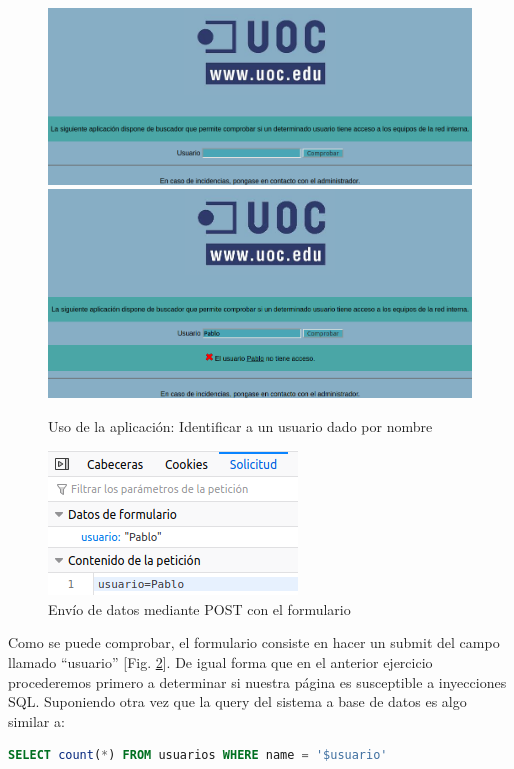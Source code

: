 \documentclass[a4paper,oneside]{article}
\begin{document}
\begin{figure}[h!]
  \centering
  \includegraphics[scale=0.4]{images/blindsql.png}\\
  \vspace{.5cm}
  \includegraphics[scale=0.4]{images/blindsql1.png}
  \caption{Uso de la aplicación: Identificar a un usuario dado por nombre}
  \label{fig:blindsql}
\end{figure}

\begin{figure}[h!]
  \centering
  \includegraphics{images/form_request.png}
  \caption{Envío de datos mediante POST con el formulario}
  \label{fig:form_request}
\end{figure}

Como se puede comprobar, el formulario consiste en hacer un submit del campo llamado ``usuario'' [Fig. \ref{fig:form_request}].
De igual forma que en el anterior ejercicio procederemos primero a determinar si nuestra página es susceptible a inyecciones SQL. Suponiendo otra vez que la query del sistema a base de datos es algo similar a:
\begin{lstlisting}[language=SQL, caption={Suposición de query en el sistema}]
SELECT count(*) FROM usuarios WHERE name = '$usuario'
\end{lstlisting}
\end{document}
